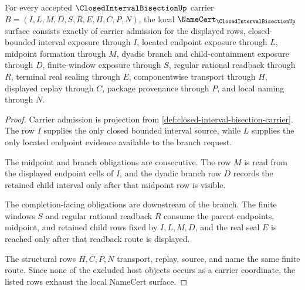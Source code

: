 \begin{theorem}
\label{thm:closed-interval-bisection-namecert-obligations}
For every accepted $\ClosedIntervalBisectionUp$ carrier $B=(I,L,M,D,S,R,E,H,C,P,N)$, the local $\NameCert_{\ClosedIntervalBisectionUp}$ surface consists exactly of carrier admission for the displayed rows, closed-bounded interval exposure through $I$, located endpoint exposure through $L$, midpoint formation through $M$, dyadic branch and child-containment exposure through $D$, finite-window exposure through $S$, regular rational readback through $R$, terminal real sealing through $E$, componentwise transport through $H$, displayed replay through $C$, package provenance through $P$, and local naming through $N$.
\end{theorem}
\begin{proof}
Carrier admission is projection from \autoref{def:closed-interval-bisection-carrier}. The row $I$ supplies the only closed bounded interval source, while $L$ supplies the only located endpoint evidence available to the branch request.

The midpoint and branch obligations are consecutive. The row $M$ is read from the displayed endpoint cells of $I$, and the dyadic branch row $D$ records the retained child interval only after that midpoint row is visible.

The completion-facing obligations are downstream of the branch. The finite windows $S$ and regular rational readback $R$ consume the parent endpoints, midpoint, and retained child rows fixed by $I,L,M,D$, and the real seal $E$ is reached only after that readback route is displayed.

The structural rows $H,C,P,N$ transport, replay, source, and name the same finite route. Since none of the excluded host objects occurs as a carrier coordinate, the listed rows exhaust the local NameCert surface.
\end{proof}


